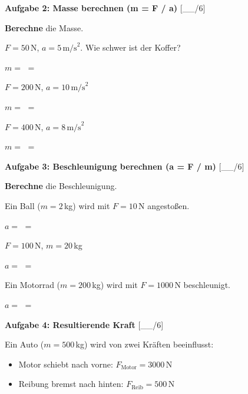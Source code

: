 \documentclass[11pt, a4paper]{article}
\newcommand{\luecke}[1]{\underline{\hspace{#1}}}
\newcommand{\punktebox}[1]{\hfill\small\textcolor{mittelgrau}{[\_\_/#1]}}
\newcommand{\aufgabe}[1]{%
    \needspace{4\baselineskip}%
    \vspace{10pt}%
    \noindent\textbf{\textcolor{fachfarbe}{Aufgabe #1}}%
    \vspace{4pt}%
    \nopagebreak[4]%
}
\newcommand{\operator}[1]{\textbf{\textcolor{fachfarbe}{#1}}}
\begin{document}

\aufgabe{2: Masse berechnen (m = F / a)} \punktebox{6}

\operator{Berechne} die Masse.

\begin{teil}
    \item $F = 50\,$N, $a = 5\,\text{m/s}^2$. Wie schwer ist der Koffer?

    \vspace{0.3em}
    $m = $ \luecke{6cm} $= $ \luecke{2cm}

    \item $F = 200\,$N, $a = 10\,\text{m/s}^2$

    \vspace{0.3em}
    $m = $ \luecke{6cm} $= $ \luecke{2cm}

    \item $F = 400\,$N, $a = 8\,\text{m/s}^2$

    \vspace{0.3em}
    $m = $ \luecke{6cm} $= $ \luecke{2cm}
\end{teil}


\aufgabe{3: Beschleunigung berechnen (a = F / m)} \punktebox{6}

\operator{Berechne} die Beschleunigung.

\begin{teil}
    \item Ein Ball ($m = 2\,$kg) wird mit $F = 10\,$N angestoßen.

    \vspace{0.3em}
    $a = $ \luecke{6cm} $= $ \luecke{2cm}

    \item $F = 100\,$N, $m = 20\,$kg

    \vspace{0.3em}
    $a = $ \luecke{6cm} $= $ \luecke{2cm}

    \item Ein Motorrad ($m = 200\,$kg) wird mit $F = 1000\,$N beschleunigt.

    \vspace{0.3em}
    $a = $ \luecke{6cm} $= $ \luecke{2cm}
\end{teil}


\aufgabe{4: Resultierende Kraft} \punktebox{6}

Ein Auto ($m = 500\,$kg) wird von zwei Kräften beeinflusst:
\begin{itemize}[leftmargin=2em, itemsep=2pt]
    \item Motor schiebt nach vorne: $F_{\text{Motor}} = 3000\,$N
    \item Reibung bremst nach hinten: $F_{\text{Reib}} = 500\,$N
\end{itemize}
\end{document}
